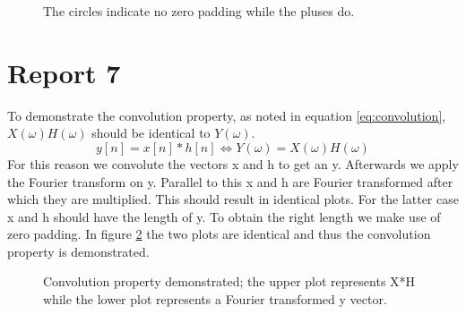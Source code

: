 \documentclass[final]{scrreprt} %
\begin{document}
\begin{figure}[H]
    \centering
	\setlength\figureheight{6cm}
    	\setlength\figurewidth{14cm}
	
	\caption{The circles indicate no zero padding while the pluses do.}
	\label{fig:zeropadding}
\end{figure}

\section*{Report 7}
To demonstrate the convolution property, as noted in equation \ref{eq:convolution}, $X(\omega)H(\omega)$ should be identical to $Y(\omega)$.
\begin{equation}
y[n] = x[n] * h[n] \Leftrightarrow Y(\omega) = X(\omega)H(\omega)
\label{eq:convolution}
\end{equation}
For this reason we convolute the vectors x and h to get an y. 
Afterwards we apply the Fourier transform on y.
Parallel to this x and h are Fourier transformed after which they are multiplied.
This should result in identical plots.
For the latter case x and h should have the length of y.
To obtain the right length we make use of zero padding.
In figure \ref{fig:convolution} the two plots are identical and thus the convolution property is demonstrated.

\begin{figure}[H]
    \centering
	\setlength\figureheight{6cm}
    	\setlength\figurewidth{14cm}
	
	\caption{Convolution property demonstrated; the upper plot represents X*H while the lower plot represents a Fourier transformed y vector.}
	\label{fig:convolution}
\end{figure}
\end{document}

